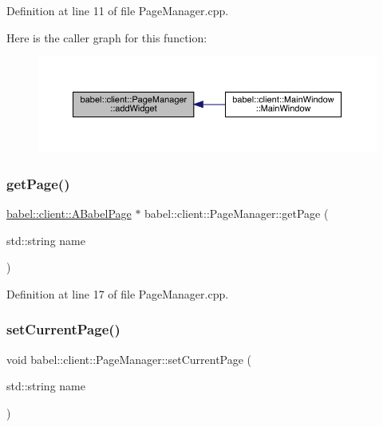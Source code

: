 Definition at line 11 of file Page\+Manager.\+cpp.

Here is the caller graph for this function\+:\nopagebreak
\begin{figure}[H]
\begin{center}
\leavevmode
\includegraphics[width=350pt]{classbabel_1_1client_1_1_page_manager_aa12f5f0233b79a29c8d6ea0d540396a0_icgraph}
\end{center}
\end{figure}
\mbox{\label{classbabel_1_1client_1_1_page_manager_a1a9343498814bdd5e07034fd7449c58e}} 
\subsubsection{\texorpdfstring{get\+Page()}{getPage()}}
{\footnotesize\ttfamily \mbox{\hyperlink{classbabel_1_1client_1_1_a_babel_page}{babel\+::client\+::\+A\+Babel\+Page}} $\ast$ babel\+::client\+::\+Page\+Manager\+::get\+Page (\begin{DoxyParamCaption}\item[{std\+::string}]{name }\end{DoxyParamCaption})}



Definition at line 17 of file Page\+Manager.\+cpp.

\mbox{\label{classbabel_1_1client_1_1_page_manager_a49153c52aa0387dbf05c16e2032a4c7d}} 
\subsubsection{\texorpdfstring{set\+Current\+Page()}{setCurrentPage()}}
{\footnotesize\ttfamily void babel\+::client\+::\+Page\+Manager\+::set\+Current\+Page (\begin{DoxyParamCaption}\item[{std\+::string}]{name }\end{DoxyParamCaption})}



